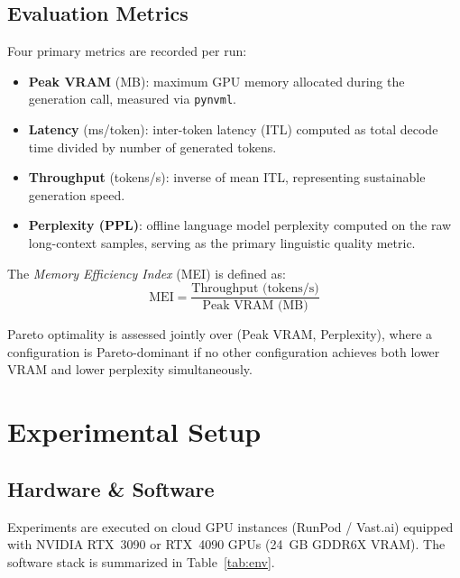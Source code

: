 \documentclass[10pt,twocolumn]{article}
\begin{document}
\subsection{Evaluation Metrics}

Four primary metrics are recorded per run:

\begin{itemize}
  \item \textbf{Peak VRAM} (MB): maximum GPU memory allocated
    during the generation call, measured via \texttt{pynvml}.
  \item \textbf{Latency} (ms/token): inter-token latency (ITL)
    computed as total decode time divided by number of generated tokens.
  \item \textbf{Throughput} (tokens/s): inverse of mean ITL,
    representing sustainable generation speed.
  \item \textbf{Perplexity (PPL)}: offline language model perplexity
    computed on the raw long-context samples, serving as the
    primary linguistic quality metric.
\end{itemize}

The \emph{Memory Efficiency Index} (MEI) is defined as:
\begin{equation}
  \text{MEI} = \frac{\text{Throughput (tokens/s)}}{\text{Peak VRAM (MB)}}
  \label{eq:mei}
\end{equation}

Pareto optimality is assessed jointly over (Peak VRAM, Perplexity),
where a configuration is Pareto-dominant if no other configuration
achieves both lower VRAM and lower perplexity simultaneously.


\section{Experimental Setup}
\label{sec:setup}

\subsection{Hardware \& Software}

Experiments are executed on cloud GPU instances (RunPod / Vast.ai)
equipped with NVIDIA RTX~3090 or RTX~4090 GPUs (24~GB GDDR6X VRAM).
The software stack is summarized in Table~\ref{tab:env}.
\end{document}
